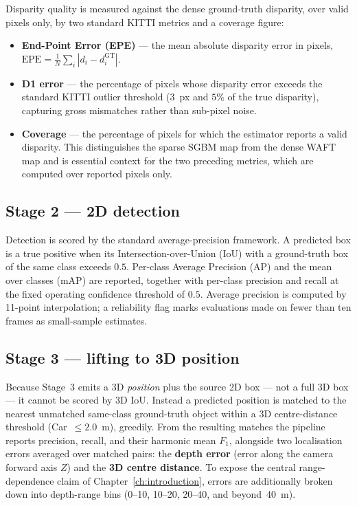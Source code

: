 Disparity quality is measured against the dense ground-truth disparity, over valid
pixels only, by two standard KITTI metrics and a coverage figure:

\begin{itemize}[leftmargin=*,itemsep=3pt]
  \item \textbf{End-Point Error (EPE)} --- the mean absolute disparity error in
  pixels, $\text{EPE} = \frac{1}{N}\sum_i |d_i - d_i^{\text{GT}}|$.
  \item \textbf{D1 error} --- the percentage of pixels whose disparity error exceeds
  the standard KITTI outlier threshold (3~px and $5\%$ of the true disparity),
  capturing gross mismatches rather than sub-pixel noise.
  \item \textbf{Coverage} --- the percentage of pixels for which the estimator
  reports a valid disparity. This distinguishes the sparse SGBM map from the dense
  WAFT map and is essential context for the two preceding metrics, which are computed
  over reported pixels only.
\end{itemize}

\subsection{Stage 2 --- 2D detection}

Detection is scored by the standard average-precision framework. A predicted box is a
true positive when its Intersection-over-Union (IoU) with a ground-truth box of the
same class exceeds $0.5$. Per-class Average Precision (AP) and the mean over classes
(mAP) are reported, together with per-class precision and recall at the fixed
operating confidence threshold of $0.5$. Average precision is computed by 11-point
interpolation; a reliability flag marks evaluations made on fewer than ten frames as
small-sample estimates.

\subsection{Stage 3 --- lifting to 3D position}
\label{sec:metricslift}

Because Stage~3 emits a 3D \emph{position} plus the source 2D box --- not a full 3D
box --- it cannot be scored by 3D IoU. Instead a predicted position is matched to the
nearest unmatched same-class ground-truth object within a 3D centre-distance
threshold (Car~$\le 2.0$~m), greedily. From the resulting matches the pipeline
reports precision, recall, and their harmonic mean $F_1$, alongside two localisation
errors averaged over matched pairs: the \textbf{depth error} (error along the camera
forward axis $Z$) and the \textbf{3D centre distance}. To expose the central
range-dependence claim of Chapter~\ref{ch:introduction}, errors are additionally
broken down into depth-range bins (0--10, 10--20, 20--40, and beyond~40~m).

